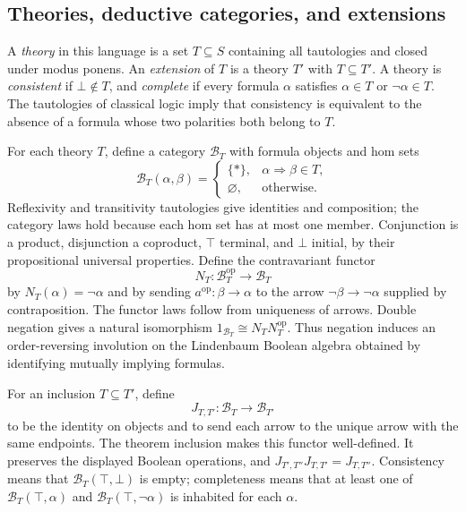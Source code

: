 \documentclass[11pt]{article}
\theoremstyle{definition}
\theoremstyle{remark}
\newcommand{\op}{\mathrm{op}}
\begin{document}
\subsection{Theories, deductive categories, and extensions}

A \emph{theory} in this language is a set $T\subseteq S$ containing
all tautologies and closed under modus ponens. An \emph{extension} of
$T$ is a theory $T'$ with $T\subseteq T'$. A theory is
\emph{consistent} if $\bot\notin T$, and \emph{complete} if every
formula $\alpha$ satisfies $\alpha\in T$ or $\neg\alpha\in T$.
The tautologies of classical logic imply that consistency is equivalent
to the absence of a formula whose two polarities both belong to $T$.

For each theory $T$, define a category $\mathcal B_T$ with formula
objects and hom sets
\[
 \mathcal B_T(\alpha,\beta)=
 \begin{cases}
 \{*\},&\alpha\Rightarrow\beta\in T,\\
 \varnothing,&\text{otherwise}.
 \end{cases}
\]
Reflexivity and transitivity tautologies give identities and composition;
the category laws hold because each hom set has at most one member.
Conjunction is a product, disjunction a coproduct, $\top$ terminal,
and $\bot$ initial, by their propositional universal properties.
Define the contravariant functor
\[
 N_T:\mathcal B_T^{\op}\longrightarrow\mathcal B_T
\]
by $N_T(\alpha)=\neg\alpha$ and by sending
$a^{\op}:\beta\to\alpha$ to the arrow
$\neg\beta\to\neg\alpha$ supplied by contraposition.
The functor laws follow from uniqueness of arrows. Double negation gives
a natural isomorphism
$1_{\mathcal B_T}\cong N_TN_T^{\op}$.
Thus negation induces an order-reversing involution on the Lindenbaum
Boolean algebra obtained by identifying mutually implying formulas.

For an inclusion $T\subseteq T'$, define
\[
 J_{T,T'}:\mathcal B_T\longrightarrow\mathcal B_{T'}
\]
to be the identity on objects and to send each arrow to the unique arrow
with the same endpoints. The theorem inclusion makes this functor
well-defined. It preserves the displayed Boolean operations, and
$J_{T',T''}J_{T,T'}=J_{T,T''}$. Consistency means that
$\mathcal B_T(\top,\bot)$ is empty; completeness means that at least one
of $\mathcal B_T(\top,\alpha)$ and
$\mathcal B_T(\top,\neg\alpha)$ is inhabited for each $\alpha$.
\end{document}
